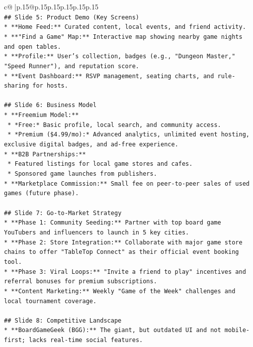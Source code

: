 \documentclass{article}
\begin{document}
{\begin{supertabular}{c@{$\;$}|p{.15\linewidth}@{}p{.15\linewidth}p{.15\linewidth}p{.15\linewidth}p{.15\linewidth}p{.15\linewidth}}
{{{\\ 
\texttt{\#\# Slide 5: Product Demo (Key Screens)} \\
\texttt{*   **Home Feed:** Curated content, local events, and friend activity.} \\
\texttt{*   **"Find a Game" Map:** Interactive map showing nearby game nights and open tables.} \\
\texttt{*   **Profile:** User's collection, badges (e.g., "Dungeon Master," "Speed Runner"), and reputation score.} \\
\texttt{*   **Event Dashboard:** RSVP management, seating charts, and rule{-}sharing for hosts.} \\
\\ 
\texttt{\#\# Slide 6: Business Model} \\
\texttt{*   **Freemium Model:**} \\
\texttt{    *   *Free:* Basic profile, local search, and community access.} \\
\texttt{    *   *Premium (\$4.99/mo):* Advanced analytics, unlimited event hosting, exclusive digital badges, and ad{-}free experience.} \\
\texttt{*   **B2B Partnerships:**} \\
\texttt{    *   Featured listings for local game stores and cafes.} \\
\texttt{    *   Sponsored game launches from publishers.} \\
\texttt{*   **Marketplace Commission:** Small fee on peer{-}to{-}peer sales of used games (future phase).} \\
\\ 
\texttt{\#\# Slide 7: Go{-}to{-}Market Strategy} \\
\texttt{*   **Phase 1: Community Seeding:** Partner with top board game YouTubers and influencers to launch in 5 key cities.} \\
\texttt{*   **Phase 2: Store Integration:** Collaborate with major game store chains to offer "TableTop Connect" as their official event booking tool.} \\
\texttt{*   **Phase 3: Viral Loops:** "Invite a friend to play" incentives and referral bonuses for premium subscriptions.} \\
\texttt{*   **Content Marketing:** Weekly "Game of the Week" challenges and local tournament coverage.} \\
\\ 
\texttt{\#\# Slide 8: Competitive Landscape} \\
\texttt{*   **BoardGameGeek (BGG):** The giant, but outdated UI and not mobile{-}first; lacks real{-}time social features.} \\
}}}
\end{supertabular}}
\end{document}
